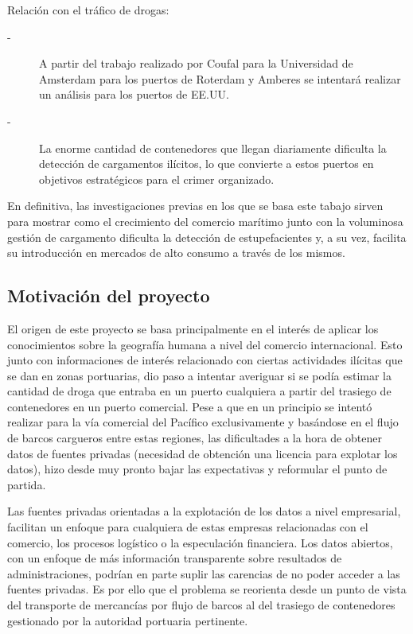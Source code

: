 \documentclass[12pt]{article}
\begin{document}
	Relación con el tráfico de drogas:
	\begin{description}
		\item[-] A partir del trabajo realizado por Coufal para la Universidad de Amsterdam \cite[]{} para los puertos de Roterdam y Amberes se intentará realizar un análisis para los puertos de EE.UU.
		\item[-] La enorme cantidad de contenedores que llegan diariamente dificulta la detección de cargamentos ilícitos, lo que convierte a estos puertos en objetivos estratégicos para el crimer organizado.
	\end{description}

	En definitiva, las investigaciones previas en los que se basa este tabajo sirven para mostrar como el crecimiento del comercio marítimo junto con la voluminosa gestión de cargamento dificulta la detección de estupefacientes y, a su vez, facilita su introducción en mercados de alto consumo a través de los mismos.
	
	\subsection{\label{motivacion}Motivación del proyecto}
	El origen de este proyecto se basa principalmente en el interés de aplicar los conocimientos sobre la geografía humana a nivel del comercio internacional. Esto junto con informaciones de interés relacionado con ciertas actividades ilícitas que se dan en zonas portuarias, dio paso a intentar averiguar si se podía estimar la cantidad de droga que entraba en un puerto cualquiera a partir del trasiego de contenedores en un puerto comercial. Pese a que en un principio se intentó realizar para la vía comercial del Pacífico exclusivamente y basándose en el flujo de barcos cargueros entre estas regiones, las dificultades a la hora de obtener datos de fuentes privadas (necesidad de obtención una licencia para explotar los datos), hizo desde muy pronto bajar las expectativas y reformular el punto de partida.
	
	Las fuentes privadas orientadas a la explotación de los datos a nivel empresarial, facilitan un enfoque para cualquiera de estas empresas relacionadas con el comercio, los procesos logístico o la especulación financiera. Los datos abiertos, con un enfoque de más información transparente sobre resultados de administraciones, podrían en parte suplir las carencias de no poder acceder a las fuentes privadas. Es por ello que el problema se reorienta desde un punto de vista del transporte de mercancías por flujo de barcos al del trasiego de contenedores gestionado por la autoridad portuaria pertinente.
	
\end{document}
